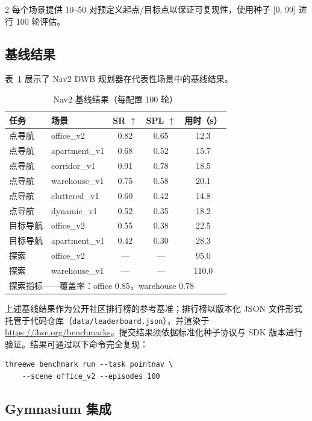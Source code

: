 \documentclass[UTF8]{ctexart}
\begin{document}
\begin{multicols}{2}
每个场景提供 10--50 对预定义起点/目标点以保证可复现性，使用种子 [0, 99] 进行 100 轮评估。

\subsection{基线结果}

表~\ref{tab:baselines} 展示了 Nav2 DWB 规划器在代表性场景中的基线结果。

\begin{table}[H]
\centering
\caption{Nav2 基线结果（每配置 100 轮）}
\label{tab:baselines}
\scriptsize
\begin{tabular}{@{}llccc@{}}
\toprule
任务 & 场景 & SR $\uparrow$ & SPL $\uparrow$ & 用时（s） \\
\midrule
点导航 & office\_v2 & 0.82 & 0.65 & 12.3 \\
点导航 & apartment\_v1 & 0.68 & 0.52 & 15.7 \\
点导航 & corridor\_v1 & 0.91 & 0.78 & 18.5 \\
点导航 & warehouse\_v1 & 0.75 & 0.58 & 20.1 \\
点导航 & cluttered\_v1 & 0.60 & 0.42 & 14.8 \\
点导航 & dynamic\_v1 & 0.52 & 0.35 & 18.2 \\
\midrule
目标导航 & office\_v2 & 0.55 & 0.38 & 22.5 \\
目标导航 & apartment\_v1 & 0.42 & 0.30 & 28.3 \\
\midrule
探索 & office\_v2 & --- & --- & 95.0 \\
探索 & warehouse\_v1 & --- & --- & 110.0 \\
\bottomrule
\multicolumn{5}{l}{\scriptsize 探索指标——覆盖率：office 0.85，warehouse 0.78}
\end{tabular}
\end{table}

上述基线结果作为公开社区排行榜的参考基准；排行榜以版本化 JSON 文件形式托管于代码仓库（\texttt{data/leaderboard.json}），并渲染于 \url{https://3we.org/benchmarks}。提交结果须依据标准化种子协议与 SDK 版本进行验证。结果可通过以下命令完全复现：

\begin{lstlisting}
threewe benchmark run --task pointnav \
    --scene office_v2 --episodes 100
\end{lstlisting}

\subsection{Gymnasium 集成}


\end{multicols}
\end{document}

